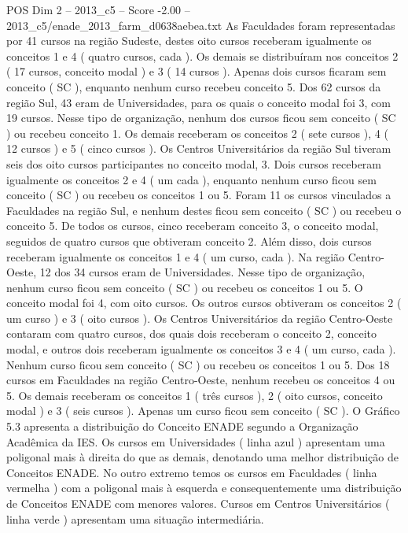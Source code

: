 \begin{textsample}{POS Dim 2 – 2013\_c5 – Score -2.00 – 2013\_c5/enade\_2013\_farm\_d0638aebea.txt}
As Faculdades foram representadas por 41 cursos na região Sudeste, destes oito cursos receberam igualmente os conceitos 1 e 4 ( quatro cursos, cada ).
Os demais se distribuíram nos conceitos 2 ( 17 cursos, conceito modal ) e 3 ( 14 cursos ).
Apenas dois cursos ficaram sem conceito ( SC ), enquanto nenhum curso recebeu conceito 5.
Dos 62 cursos da região Sul, 43 eram de Universidades, para os quais o conceito modal foi 3, com 19 cursos.
Nesse tipo de organização, nenhum dos cursos ficou sem conceito ( SC ) ou recebeu conceito 1.
Os demais receberam os conceitos 2 ( sete cursos ), 4 ( 12 cursos ) e 5 ( cinco cursos ).
Os Centros Universitários da região Sul tiveram seis dos oito cursos participantes no conceito modal, 3.
Dois cursos receberam igualmente os conceitos 2 e 4 ( um cada ), enquanto nenhum curso ficou sem conceito ( SC ) ou recebeu os conceitos 1 ou 5.
Foram 11 os cursos vinculados a Faculdades na região Sul, e nenhum destes ficou sem conceito ( SC ) ou recebeu o conceito 5.
De todos os cursos, cinco receberam conceito 3, o conceito modal, seguidos de quatro cursos que obtiveram conceito 2.
Além disso, dois cursos receberam igualmente os conceitos 1 e 4 ( um curso, cada ).
Na região Centro-Oeste, 12 dos 34 cursos eram de Universidades.
Nesse tipo de organização, nenhum curso ficou sem conceito ( SC ) ou recebeu os conceitos 1 ou 5.
O conceito modal foi 4, com oito cursos.
Os outros cursos obtiveram os conceitos 2 ( um curso ) e 3 ( oito cursos ).
Os Centros Universitários da região Centro-Oeste contaram com quatro cursos, dos quais dois receberam o conceito 2, conceito modal, e outros dois receberam igualmente os conceitos 3 e 4 ( um curso, cada ).
Nenhum curso ficou sem conceito ( SC ) ou recebeu os conceitos 1 ou 5.
Dos 18 cursos em Faculdades na região Centro-Oeste, nenhum recebeu os conceitos 4 ou 5.
Os demais receberam os conceitos 1 ( três cursos ), 2 ( oito cursos, conceito modal ) e 3 ( seis cursos ).
Apenas um curso ficou sem conceito ( SC ).
O Gráfico 5.3 apresenta a distribuição do Conceito ENADE segundo a Organização Acadêmica da IES.
Os cursos em Universidades ( linha azul ) apresentam uma poligonal mais à direita do que as demais, denotando uma melhor distribuição de Conceitos ENADE.
No outro extremo temos os cursos em Faculdades ( linha vermelha ) com a poligonal mais à esquerda e consequentemente uma distribuição de Conceitos ENADE com menores valores.
Cursos em Centros Universitários ( linha verde ) apresentam uma situação intermediária.

\end{textsample}
